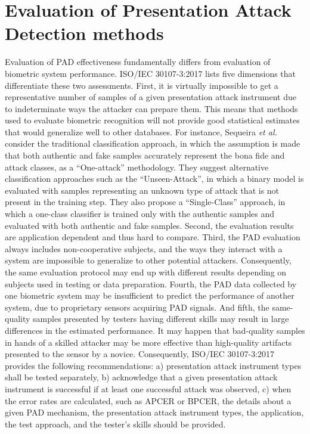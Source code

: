 \documentclass[format=acmsmall, review=false, timestamp=false]{acmart}
\newcommand{\etal}{{\it et al.}~}
\begin{document}
\section{Evaluation of Presentation Attack Detection methods}
\label{sec:EvaluationAndPerformance}

Evaluation of PAD effectiveness fundamentally differs from evaluation of biometric system performance. ISO/IEC 30107-3:2017 lists five dimensions that differentiate these two assessments. First, it is virtually impossible to get a representative number of samples of a given presentation attack instrument due to indeterminate ways the attacker can prepare them. This means that methods used to evaluate biometric recognition will not provide good statistical estimates that would generalize well to other databases. {For instance, Sequeira \etal \cite{Sequeira_TSP_2016} consider the traditional classification approach, in which the assumption is made that both authentic and fake samples accurately represent the bona fide and attack classes, as a ``One-attack'' methodology. They suggest alternative classification approaches such as the ``Unseen-Attack'', in which a binary model is evaluated with samples representing an unknown type of attack that is not present in the training step. They also propose a ``Single-Class'' approach, in which a one-class classifier is trained only with the authentic samples and evaluated with both authentic and fake samples.} Second, the evaluation results are application dependent and thus hard to compare. Third, the PAD evaluation always includes non-cooperative subjects, and the ways they interact with a system are impossible to generalize to other potential attackers. Consequently, the same evaluation protocol may end up with different results depending on subjects used in testing or data preparation. Fourth, the PAD data collected by one biometric system may be insufficient to predict the performance of another system, due to proprietary sensors acquiring PAD signals. And fifth, the same-quality samples presented by testers having different skills may result in large differences in the estimated performance. It may happen that bad-quality samples in hands of a skilled attacker may be more effective than high-quality artifacts presented to the sensor by a novice. Consequently, ISO/IEC 30107-3:2017 provides the following recommendations: a) presentation attack instrument types shall be tested separately, b) acknowledge that a given presentation attack instrument is successful if at least one successful attack was observed, c) when the error rates are calculated, such as APCER or BPCER, the details about a given PAD mechanism, the presentation attack instrument types, the application, the test approach, and the tester's skills should be provided.
\end{document}
